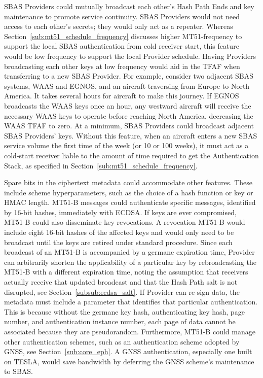 \documentclass[letterpaper,times]{IONconf/IONconf}
\begin{document}
		SBAS Providers could mutually broadcast each other's Hash Path Ends and key maintenance to promote service continuity.
		SBAS Providers would not need access to each other's secrets; they would only act as a repeater.
		Whereas Section~\ref{sub:mt51_schedule_frequency} discusses higher MT51-frequency to support the local SBAS authentication from cold receiver start, this feature would be low frequency to support the local Provider schedule.
		Having Providers broadcasting each other keys at low frequency would aid in the TFAF when transferring to a new SBAS Provider.
		For example, consider two adjacent SBAS systems, WAAS and EGNOS, and an aircraft traversing from Europe to North America.
		It takes several hours for aircraft to make this journey.
		If EGNOS broadcasts the WAAS keys once an hour, any westward aircraft will receive the necessary WAAS keys to operate before reaching North America, decreasing the WAAS TFAF to zero. 
		At a minimum, SBAS Providers could broadcast adjacent SBAS Providers' keys.
		Without this feature, when an aircraft enters a new SBAS service volume the first time of the week (or 10 or 100 weeks), it must act as a cold-start receiver liable to the amount of time required to get the Authentication Stack, as specified in Section~\ref{sub:mt51_schedule_frequency}.

		Spare bits in the ciphertext metadata could accommodate other features.
		These include scheme hyperparameters, such as the choice of a hash function or key or HMAC length.
		MT51-B messages could authenticate specific messages, identified by 16-bit hashes, immediately with ECDSA.
		If keys are ever compromised, MT51-B could also disseminate key revocations.
		A revocation MT51-B would include eight 16-bit hashes of the affected keys and would only need to be broadcast until the keys are retired under standard procedure.
		Since each broadcast of an MT51-B is accompanied by a germane expiration time, Provider can arbitrarily shorten the applicability of a particular key by rebroadcasting the MT51-B with a different expiration time, noting the assumption that receivers actually receive that updated broadcast and that the Hash Path salt is not disrupted, see Section~\ref{subsub:ecdsa_salt}. 
		If Provider can re-sign data, the metadata must include a parameter that identifies that particular authentication.
		This is because without the germane key hash, authenticating key hash, page number, and authentication instance number, each page of data cannot be associated because they are pseudorandom.
		Furthermore, MT51-B could manage other authentication schemes, such as an authentication scheme adopted by GNSS, see Section~\ref{sub:core_eph}.
		A GNSS authentication, especially one built on TESLA, would save bandwidth by deferring the GNSS scheme's maintenance to SBAS.
\end{document}
